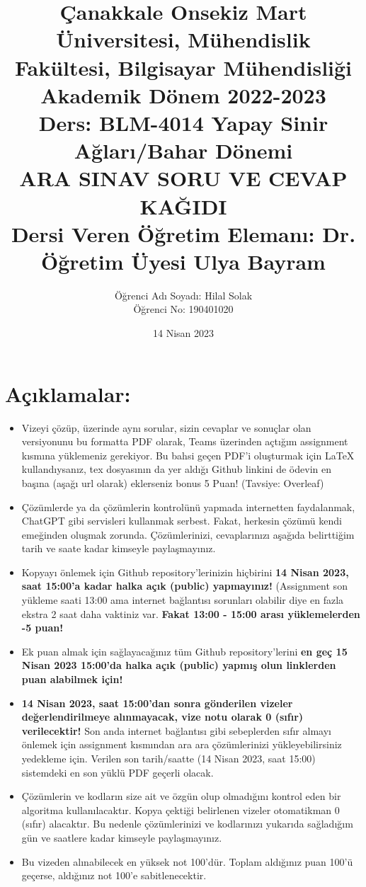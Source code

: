\documentclass[11pt]{article}
\title{Çanakkale Onsekiz Mart Üniversitesi, Mühendislik Fakültesi, Bilgisayar Mühendisliği Akademik Dönem 2022-2023\\
Ders: BLM-4014 Yapay Sinir Ağları/Bahar Dönemi\\ 
ARA SINAV SORU VE CEVAP KAĞIDI\\
Dersi Veren Öğretim Elemanı: Dr. Öğretim Üyesi Ulya Bayram}
\author{%
\begin{minipage}{\textwidth}
\raggedright
Öğrenci Adı Soyadı: Hilal Solak\\ %
Öğrenci No: 190401020
\end{minipage}%
}
\date{14 Nisan 2023}
\begin{document}
\maketitle

\vspace{-.5in}
\section*{Açıklamalar:}
\begin{itemize}
    \item Vizeyi çözüp, üzerinde aynı sorular, sizin cevaplar ve sonuçlar olan versiyonunu bu formatta PDF olarak, Teams üzerinden açtığım assignment kısmına yüklemeniz gerekiyor. Bu bahsi geçen PDF'i oluşturmak için LaTeX kullandıysanız, tex dosyasının da yer aldığı Github linkini de ödevin en başına (aşağı url olarak) eklerseniz bonus 5 Puan! (Tavsiye: Overleaf)
    \item Çözümlerde ya da çözümlerin kontrolünü yapmada internetten faydalanmak, ChatGPT gibi servisleri kullanmak serbest. Fakat, herkesin çözümü kendi emeğinden oluşmak zorunda. Çözümlerinizi, cevaplarınızı aşağıda belirttiğim tarih ve saate kadar kimseyle paylaşmayınız. 
    \item Kopyayı önlemek için Github repository'lerinizin hiçbirini \textbf{14 Nisan 2023, saat 15:00'a kadar halka açık (public) yapmayınız!} (Assignment son yükleme saati 13:00 ama internet bağlantısı sorunları olabilir diye en fazla ekstra 2 saat daha vaktiniz var. \textbf{Fakat 13:00 - 15:00 arası yüklemelerden -5 puan!}
    \item Ek puan almak için sağlayacağınız tüm Github repository'lerini \textbf{en geç 15 Nisan 2023 15:00'da halka açık (public) yapmış olun linklerden puan alabilmek için!}
    \item \textbf{14 Nisan 2023, saat 15:00'dan sonra gönderilen vizeler değerlendirilmeye alınmayacak, vize notu olarak 0 (sıfır) verilecektir!} Son anda internet bağlantısı gibi sebeplerden sıfır almayı önlemek için assignment kısmından ara ara çözümlerinizi yükleyebilirsiniz yedekleme için. Verilen son tarih/saatte (14 Nisan 2023, saat 15:00) sistemdeki en son yüklü PDF geçerli olacak.
    \item Çözümlerin ve kodların size ait ve özgün olup olmadığını kontrol eden bir algoritma kullanılacaktır. Kopya çektiği belirlenen vizeler otomatikman 0 (sıfır) alacaktır. Bu nedenle çözümlerinizi ve kodlarınızı yukarıda sağladığım gün ve saatlere kadar kimseyle paylaşmayınız.
    \item Bu vizeden alınabilecek en yüksek not 100'dür. Toplam aldığınız puan 100'ü geçerse, aldığınız not 100'e sabitlenecektir.

\end{itemize}
\end{document}
